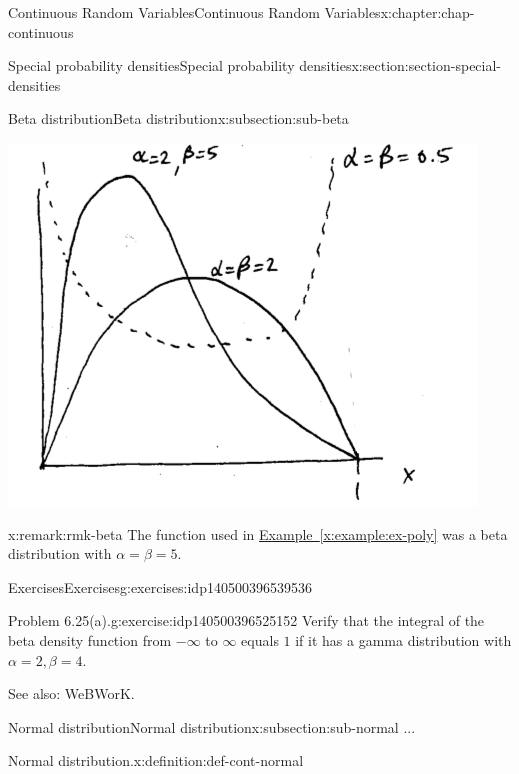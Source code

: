 \documentclass[oneside,10pt,]{book}
\newcommand{\xreffont}{\relax}
\begin{document}
\begin{chapterptx}{Continuous Random Variables}{}{Continuous Random Variables}{}{}{x:chapter:chap-continuous}
\begin{sectionptx}{Special probability densities}{}{Special probability densities}{}{}{x:section:section-special-densities}
\begin{subsectionptx}{Beta distribution}{}{Beta distribution}{}{}{x:subsection:sub-beta}
\begin{figureptx}
\begin{image}{0.25}{0.5}{0.25}
\includegraphics[width=\linewidth]{./images/betas.png}
\end{image}%
\tcblower
\end{figureptx}%
\begin{remark}{}{x:remark:rmk-beta}%
The function used in \hyperref[x:example:ex-poly]{Example~{\xreffont\ref{x:example:ex-poly}}} was a beta distribution with \(\alpha=\beta=5\).%
\end{remark}
%
%
\typeout{************************************************}
\typeout{************************************************}
%
\begin{exercises-subsubsection}{Exercises}{}{Exercises}{}{}{g:exercises:idp140500396539536}
\begin{divisionexercise}{1}{Problem 6.25(a).}{}{g:exercise:idp140500396525152}%
Verify that the integral of the beta density function from \(-\infty\) to \(\infty\) equals \(1\) if it has a gamma distribution with \(\alpha=2, \beta=4\).%
\end{divisionexercise}%
See also: WeBWorK.%
\end{exercises-subsubsection}
\end{subsectionptx}
%
%
\typeout{************************************************}
\typeout{************************************************}
%
\begin{subsectionptx}{Normal distribution}{}{Normal distribution}{}{}{x:subsection:sub-normal}
...%
\begin{definition}{Normal distribution.}{x:definition:def-cont-normal}%

\end{definition}
\end{subsectionptx}
\end{sectionptx}
\end{chapterptx}
\end{document}
